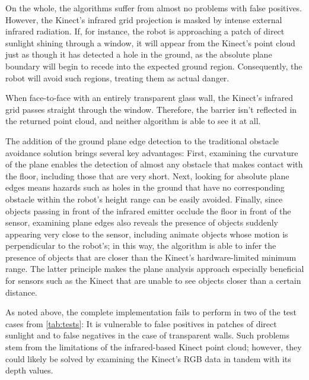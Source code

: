 \documentclass[12pt]{report}
\begin{document}
On the whole, the algorithms suffer from almost no problems with false positives.  However, the Kinect's infrared grid projection is masked by intense external infrared radiation.  If, for instance, the robot is approaching a patch of direct sunlight shining through a window, it will appear from the Kinect's point cloud just as though it has detected a hole in the ground, as the absolute plane boundary will begin to recede into the expected ground region.  Consequently, the robot will avoid such regions, treating them as actual danger.

When face-to-face with an entirely transparent glass wall, the Kinect's infrared grid passes straight through the window.  Therefore, the barrier isn't reflected in the returned point cloud, and neither algorithm is able to see it at all.

The addition of the ground plane edge detection to the traditional obstacle avoidance solution brings several key advantages:  First, examining the curvature of the plane enables the detection of almost any obstacle that makes contact with the floor, including those that are very short.  Next, looking for absolute plane edges means hazards such as holes in the ground that have no corresponding obstacle within the robot's height range can be easily avoided.  Finally, since objects passing in front of the infrared emitter occlude the floor in front of the sensor, examining plane edges also reveals the presence of objects suddenly appearing very close to the sensor, including animate objects whose motion is perpendicular to the robot's; in this way, the algorithm is able to infer the presence of objects that are closer than the Kinect's hardware-limited minimum range.  The latter principle makes the plane analysis approach especially beneficial for sensors such as the Kinect that are unable to see objects closer than a certain distance.

As noted above, the complete implementation fails to perform in two of the test cases from \autoref{tab:tests}:  It is vulnerable to false positives in patches of direct sunlight and to false negatives in the case of transparent walls.  Such problems stem from the limitations of the infrared-based Kinect point cloud; however, they could likely be solved by examining the Kinect's RGB data in tandem with its depth values.
\end{document}
